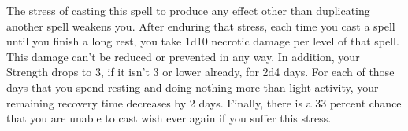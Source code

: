 \documentclass[11pt, A4paper, english]{article}
\begin{document}
The stress of casting this spell to produce any effect other than duplicating another spell weakens you. After enduring that stress, each time you cast a spell until you finish a long rest, you take 1d10 necrotic damage per level of that spell. This damage can’t be reduced or prevented in any way. In addition, your Strength drops to 3, if it isn’t 3 or lower already, for 2d4 days. For each of those days that you spend resting and doing nothing more than light activity, your remaining recovery time decreases by 2 days. Finally, there is a 33 percent chance that you are unable to cast wish ever again if you suffer this stress.
\end{document}
